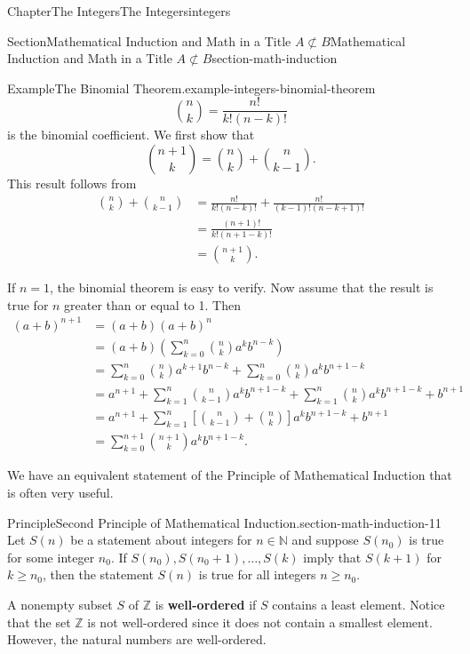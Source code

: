 \documentclass[oneside,10pt,]{book}
\newcommand{\terminology}[1]{\textbf{#1}}
\numberwithin{equation}{section}
\newcommand{\notsubset}{\not\subset}
\begin{document}
\begin{chapterptx}{Chapter}{The Integers}{}{The Integers}{}{}{integers}
\begin{sectionptx}{Section}{Mathematical Induction and Math in a Title \(A\notsubset B\)}{}{Mathematical Induction and Math in a Title \(A\notsubset B\)}{}{}{section-math-induction}
\begin{example}{Example}{The Binomial Theorem.}{example-integers-binomial-theorem}
\begin{equation*}
\binom{n}{k} = \frac{n!}{k! (n - k)!}
\end{equation*}
is the binomial coefficient.  We first show that%
\begin{equation*}
\binom{n + 1}{k} = \binom{n}{k} + \binom{n}{k - 1}\text{.}
\end{equation*}
This result follows from%
\begin{align*}
\binom{n}{k} + \binom{n}{k - 1} & = \frac{n!}{k!(n - k)!} +\frac{n!}{(k-1)!(n - k + 1)!}\\
& = \frac{(n + 1)!}{k!(n + 1 - k)!}\\
& =\binom{n + 1}{k}\text{.}
\end{align*}
\label{example-integers-binomial-theorem-2-8}\label{example-integers-binomial-theorem-2-9}%
\par
If \(n = 1\), the binomial theorem is easy to verify. Now assume that the result is true for \(n\) greater than or equal to 1.  Then%
\begin{align*}
(a + b)^{n + 1} & = (a + b)(a + b)^n\\
& = (a + b) \left( \sum_{k = 0}^{n} \binom{n}{k} a^k b^{n - k}\right)\\
& = \sum_{k = 0}^{n} \binom{n}{k} a^{k + 1} b^{n - k} + \sum_{k = 0}^{n} \binom{n}{k} a^k b^{n + 1 - k}\\
& = a^{n + 1} + \sum_{k = 1}^{n} \binom{n}{k - 1} a^{k} b^{n + 1 - k} + \sum_{k = 1}^{n} \binom{n}{k}  a^k b^{n + 1 - k} + b^{n + 1}\\
&  = a^{n + 1} + \sum_{k = 1}^{n} \left[ \binom{n}{k - 1} + \binom{n}{k} \right]a^k b^{n + 1 - k} + b^{n + 1}\\
&  = \sum_{k = 0}^{n + 1}   \binom{n + 1}{k} a^k b^{n + 1- k}\text{.}
\end{align*}
%
\end{example}
We have an equivalent statement of the Principle of Mathematical Induction that is often very useful.%
\begin{principle}{Principle}{Second Principle of Mathematical Induction.}{}{section-math-induction-11}%
%
Let \(S(n)\) be a statement about integers for  \(n \in {\mathbb N}\) and suppose \(S(n_0)\) is true for some integer \(n_0\).  If \(S(n_0), S(n_0 + 1), \ldots, S(k)\) imply that \(S(k + 1)\) for \(k \geq n_0\), then the statement \(S(n)\) is true for all integers \(n \geq n_0\).%
\end{principle}
A  nonempty subset \(S\) of \({\mathbb Z}\) is \terminology{well-ordered} if \(S\) contains a least element.  Notice that the set \({\mathbb Z}\) is not well-ordered since it does not contain a smallest element.  However, the natural numbers are well-ordered.%

\end{sectionptx}
\end{chapterptx}
\end{document}
